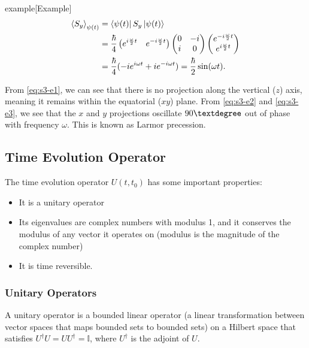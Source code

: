 \documentclass{article}
\begin{document}
\begin{callout}{example}[Example]
\begin{align}
    \left\langle S_y \right\rangle _{\psi (t)} &= \bra{\psi (t)}S_y \ket{\psi (t)} \nonumber\\
                                               &=\frac{\hbar}{4}\left( e^{i \frac{\omega }{2}t}\quad e^{-i \frac{\omega }{2}t} \right)\begin{pmatrix}
                                                   0 & -i \\ i & 0
                                               \end{pmatrix}\begin{pmatrix}
                                                   e^{-i \frac{\omega }{2}t} \\
                                                   e^{i \frac{\omega }{2}t}
                                               \end{pmatrix} \nonumber\\
                                               &=\frac{\hbar}{4}(-ie^{i\omega t}+ie^{-i\omega t})=\frac{\hbar}{2}\sin(\omega t). \label{eq:s3-e3}
\end{align}

From \ref{eq:s3-e1}, we can see that there is no projection along the vertical ($z$) axis, meaning it remains within the equatorial ($xy$) plane. From \ref{eq:s3-e2} and \ref{eq:s3-e3}, we see that the $x$ and $y$ projections oscillate $90\textdegree$ out of phase with frequency $\omega $. This is known as Larmor precession.
\end{callout}

\subsection{Time Evolution Operator}
The time evolution operator $U(t,t_0)$ has some important properties:
\begin{itemize}
    \item It is a unitary operator
    \item Its eigenvalues are complex numbers with modulus 1, and it conserves the modulus of any vector it operates on (modulus is the magnitude of the complex number)
    \item It is time reversible.
\end{itemize}

\subsubsection{Unitary Operators}
A unitary operator is a bounded linear operator (a linear transformation between vector spaces that maps bounded sets to bounded sets) on a Hilbert space that satisfies $U^\dagger U=UU^\dagger=\mathbb{I}$, where $U^\dagger$ is the adjoint of $U$.
\end{document}
